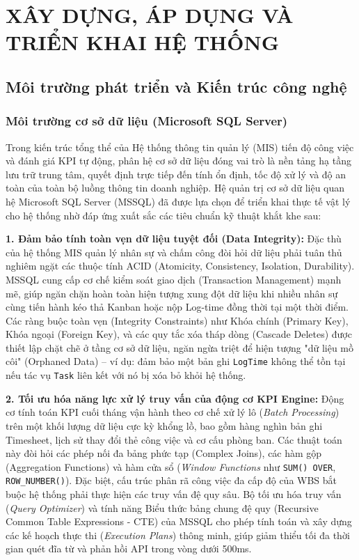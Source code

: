 \documentclass[a4paper,13.5pt]{extreport}
\begin{document}
\chapter{XÂY DỰNG, ÁP DỤNG VÀ TRIỂN KHAI HỆ THỐNG}

\section{Môi trường phát triển và Kiến trúc công nghệ}
\subsection{Môi trường cơ sở dữ liệu (Microsoft SQL Server)}

Trong kiến trúc tổng thể của Hệ thống thông tin quản lý (MIS) tiến độ công việc và đánh giá KPI tự động, phân hệ cơ sở dữ liệu đóng vai trò là nền tảng hạ tầng lưu trữ trung tâm, quyết định trực tiếp đến tính ổn định, tốc độ xử lý và độ an toàn của toàn bộ luồng thông tin doanh nghiệp. Hệ quản trị cơ sở dữ liệu quan hệ Microsoft SQL Server (MSSQL) đã được lựa chọn để triển khai thực tế vật lý cho hệ thống nhờ đáp ứng xuất sắc các tiêu chuẩn kỹ thuật khắt khe sau:

\textbf{1. Đảm bảo tính toàn vẹn dữ liệu tuyệt đối (Data Integrity):} 
Đặc thù của hệ thống MIS quản lý nhân sự và chấm công đòi hỏi dữ liệu phải tuân thủ nghiêm ngặt các thuộc tính ACID (Atomicity, Consistency, Isolation, Durability). MSSQL cung cấp cơ chế kiểm soát giao dịch (Transaction Management) mạnh mẽ, giúp ngăn chặn hoàn toàn hiện tượng xung đột dữ liệu khi nhiều nhân sự cùng tiến hành kéo thả Kanban hoặc nộp Log-time đồng thời tại một thời điểm. Các ràng buộc toàn vẹn (Integrity Constraints) như Khóa chính (Primary Key), Khóa ngoại (Foreign Key), và các quy tắc xóa tháp dòng (Cascade Deletes) được thiết lập chặt chẽ ở tầng cơ sở dữ liệu, ngăn ngừa triệt để hiện tượng "dữ liệu mồ côi" (Orphaned Data) – ví dụ: đảm bảo một bản ghi \texttt{LogTime} không thể tồn tại nếu tác vụ \texttt{Task} liên kết với nó bị xóa bỏ khỏi hệ thống.

\textbf{2. Tối ưu hóa năng lực xử lý truy vấn của động cơ KPI Engine:} 
Động cơ tính toán KPI cuối tháng vận hành theo cơ chế xử lý lô (\textit{Batch Processing}) trên một khối lượng dữ liệu cực kỳ khổng lồ, bao gồm hàng nghìn bản ghi Timesheet, lịch sử thay đổi thẻ công việc và cơ cấu phòng ban. Các thuật toán này đòi hỏi các phép nối đa bảng phức tạp (Complex Joins), các hàm gộp (Aggregation Functions) và hàm cửa sổ (\textit{Window Functions} như \texttt{SUM() OVER}, \texttt{ROW\_NUMBER()}). Đặc biệt, cấu trúc phân rã công việc đa cấp độ của WBS bắt buộc hệ thống phải thực hiện các truy vấn đệ quy sâu. Bộ tối ưu hóa truy vấn (\textit{Query Optimizer}) và tính năng Biểu thức bảng chung đệ quy (Recursive Common Table Expressions - CTE) của MSSQL cho phép tính toán và xây dựng các kế hoạch thực thi (\textit{Execution Plans}) thông minh, giúp giảm thiểu tối đa thời gian quét đĩa từ và phản hồi API trong vòng dưới 500ms.
\end{document}

